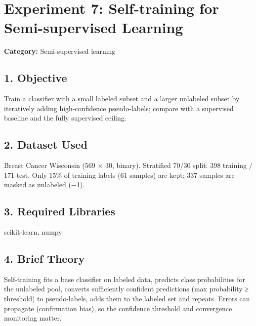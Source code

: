
\chapter{Experiment 7: Self-training for Semi-supervised
Learning}\label{experiment-7-self-training-for-semi-supervised-learning}

\textbf{Category:} Semi-supervised learning

\section{1. Objective}\label{objective}

Train a classifier with a small labeled subset and a larger unlabeled
subset by iteratively adding high-confidence pseudo-labels; compare with
a supervised baseline and the fully supervised ceiling.

\section{2. Dataset Used}\label{dataset-used}

Breast Cancer Wisconsin (569 × 30, binary). Stratified 70/30 split: 398
training / 171 test. Only 15\% of training labels (61 samples) are kept;
337 samples are masked as unlabeled (−1).

\section{3. Required Libraries}\label{required-libraries}

scikit-learn, numpy

\section{4. Brief Theory}\label{brief-theory}

Self-training fits a base classifier on labeled data, predicts class
probabilities for the unlabeled pool, converts sufficiently confident
predictions (max probability ≥ threshold) to pseudo-labels, adds them to
the labeled set and repeats. Errors can propagate (confirmation bias),
so the confidence threshold and convergence monitoring matter.

